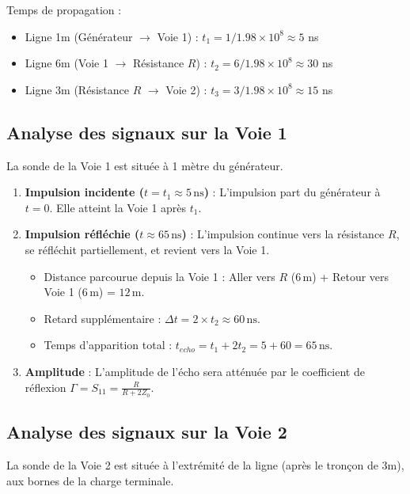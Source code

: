 \documentclass[12pt,a4paper]{article}
\begin{document}
Temps de propagation :
\begin{itemize}
\item Ligne 1m (Générateur $\to$ Voie 1) : $t_1 = 1/1.98 \times 10^8 \approx 5$ ns
\item Ligne 6m (Voie 1 $\to$ Résistance $R$) : $t_2 = 6/1.98 \times 10^8 \approx 30$ ns
\item Ligne 3m (Résistance $R$ $\to$ Voie 2) : $t_3 = 3/1.98 \times 10^8 \approx 15$ ns
\end{itemize}

\subsection{Analyse des signaux sur la Voie 1}
La sonde de la Voie 1 est située à 1 mètre du générateur.

\begin{enumerate}
    \item \textbf{Impulsion incidente ($t = t_1 \approx 5\,\text{ns}$)} :
    L'impulsion part du générateur à $t=0$. Elle atteint la Voie 1 après $t_1$.
    \item \textbf{Impulsion réfléchie ($t \approx 65\,\text{ns}$)} :
    L'impulsion continue vers la résistance $R$, se réfléchit partiellement, et revient vers la Voie 1.
    \begin{itemize}
        \item Distance parcourue depuis la Voie 1 : Aller vers $R$ ($6\,\text{m}$) + Retour vers Voie 1 ($6\,\text{m}$) = $12\,\text{m}$.
        \item Retard supplémentaire : $\Delta t = 2 \times t_2 \approx 60\,\text{ns}$.
        \item Temps d'apparition total : $t_{echo} = t_1 + 2t_2 = 5 + 60 = 65\,\text{ns}$.
    \end{itemize}
    \item \textbf{Amplitude} : L'amplitude de l'écho sera atténuée par le coefficient de réflexion $\Gamma = S_{11} = \frac{R}{R+2Z_0}$.
\end{enumerate}

\subsection{Analyse des signaux sur la Voie 2}
La sonde de la Voie 2 est située à l'extrémité de la ligne (après le tronçon de 3m), aux bornes de la charge terminale.
\end{document}
